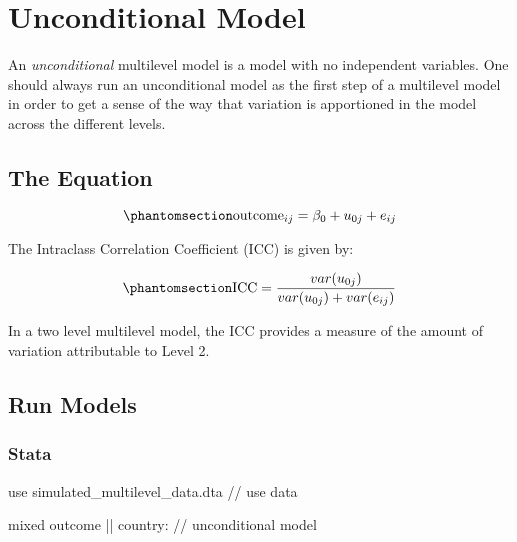 \documentclass[
  letterpaper,
  DIV=11,
  numbers=noendperiod]{scrreprt}
\newenvironment{Shaded}{\begin{snugshade}}{\end{snugshade}}
\newcommand{\CommentTok}[1]{\textcolor[rgb]{0.37,0.37,0.37}{#1}}
\newcommand{\KeywordTok}[1]{\textcolor[rgb]{0.00,0.23,0.31}{#1}}
\newcommand{\NormalTok}[1]{\textcolor[rgb]{0.00,0.23,0.31}{#1}}
\begin{document}

\chapter{Unconditional Model}\label{unconditional-model}

An \emph{unconditional} multilevel model is a model with no independent
variables. One should always run an unconditional model as the first
step of a multilevel model in order to get a sense of the way that
variation is apportioned in the model across the different levels.

\section{The Equation}\label{the-equation}

\begin{equation}\phantomsection\label{eq-MLMunconditional}{\text{outcome}_{ij}= \beta_0 + u_{0j} + e_{ij}}\end{equation}

The Intraclass Correlation Coefficient (ICC) is given by:

\begin{equation}\phantomsection\label{eq-ICCunconditional}{\text{ICC} = \frac{var(u_{0j})}{var(u_{0j}) + var(e_{ij})}}\end{equation}

In a two level multilevel model, the ICC provides a measure of the
amount of variation attributable to Level 2.

\section{Run Models}\label{run-models}

\subsection{Stata}

\begin{Shaded}
\begin{Highlighting}[]

\KeywordTok{use}\NormalTok{ simulated\_multilevel\_data.dta }\CommentTok{// use data}
\end{Highlighting}
\end{Shaded}

\begin{Shaded}
\begin{Highlighting}[]

\NormalTok{mixed outcome || country: }\CommentTok{// unconditional model}
  
\end{Highlighting}
\end{Shaded}
\end{document}
